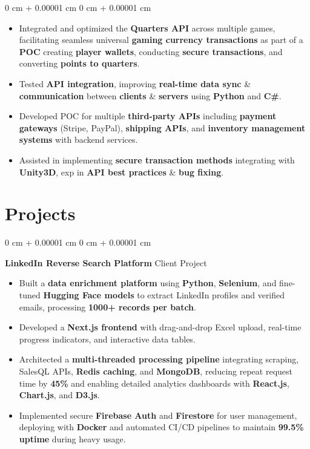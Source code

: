 \documentclass[10pt, letterpaper]{article}
\newenvironment{highlights}{
    \begin{itemize}[
        topsep=0.10 cm,
        parsep=0.10 cm,
        partopsep=0pt,
        itemsep=0pt,
        leftmargin=0 cm + 10pt
    ]
}{
    \end{itemize}
} %
\newenvironment{onecolentry}{
    \begin{adjustwidth}{
        0 cm + 0.00001 cm
    }{
        0 cm + 0.00001 cm
    }
}{
    \end{adjustwidth}
} %
\begin{document}
\begin{onecolentry}
	\begin{highlights}
		\item Integrated and optimized the \textbf{Quarters API} across multiple games, facilitating seamless universal \textbf{gaming currency transactions} as part of a \textbf{POC} creating \textbf{player wallets}, conducting \textbf{secure transactions}, and converting \textbf{points to quarters}.
		\item Tested \textbf{API integration}, improving \textbf{real-time data sync} \& \textbf{communication} between \textbf{clients} \& \textbf{servers} using \textbf{Python} and \textbf{C\#}.
		\item Developed POC for multiple \textbf{third-party APIs} including \textbf{payment gateways} (Stripe, PayPal), \textbf{shipping APIs}, and \textbf{inventory management systems} with backend services.
		\item Assisted in implementing \textbf{secure transaction methods} integrating with \textbf{Unity3D}, exp in \textbf{API best practices} \& \textbf{bug fixing}.
	\end{highlights}
\end{onecolentry}



\vspace{0.2 cm}


\section{Projects}
\vspace{0.05 cm}

\begin{onecolentry}
	\textbf{LinkedIn Reverse Search Platform} \hfill Client Project
	\begin{highlights}
		\item Built a \textbf{data enrichment platform} using \textbf{Python}, \textbf{Selenium}, and fine-tuned \textbf{Hugging Face models} to extract LinkedIn profiles and verified emails, processing \textbf{1000+ records per batch}.
		\item Developed a \textbf{Next.js frontend} with drag-and-drop Excel upload, real-time progress indicators, and interactive data tables.
		\item Architected a \textbf{multi-threaded processing pipeline} integrating scraping, SalesQL APIs, \textbf{Redis caching}, and \textbf{MongoDB}, reducing repeat request time by \textbf{45\%} and enabling detailed analytics dashboards with \textbf{React.js}, \textbf{Chart.js}, and \textbf{D3.js}.
		\item Implemented secure \textbf{Firebase Auth} and \textbf{Firestore} for user management, deploying with \textbf{Docker} and automated CI/CD pipelines to maintain \textbf{99.5\% uptime} during heavy usage.
	\end{highlights}
\end{onecolentry}
\end{document}
